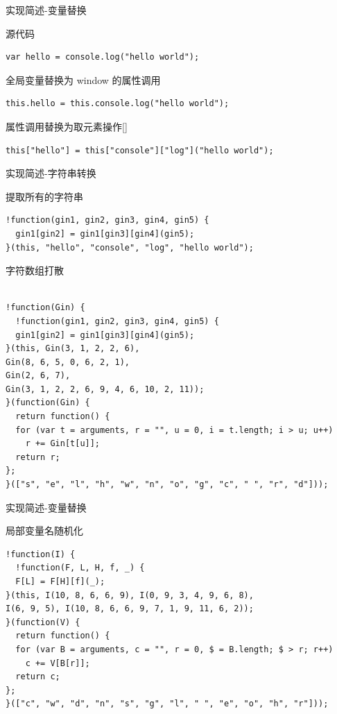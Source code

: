 \documentclass[presentation]{beamer}
\begin{document}
\begin{frame}[fragile,label=sec-11]{实现简述-变量替换}
\begin{block}{源代码}
\begin{verbatim}
var hello = console.log("hello world");
\end{verbatim}
\end{block}
\begin{block}{全局变量替换为 window 的属性调用}
\begin{verbatim}
this.hello = this.console.log("hello world");
\end{verbatim}
\end{block}
\begin{block}{属性调用替换为取元素操作[]}
\begin{verbatim}
this["hello"] = this["console"]["log"]("hello world");
\end{verbatim}
\end{block}
\end{frame}
\begin{frame}[fragile,label=sec-12]{实现简述-字符串转换}
\begin{block}{提取所有的字符串}
\begin{verbatim}
!function(gin1, gin2, gin3, gin4, gin5) {
  gin1[gin2] = gin1[gin3][gin4](gin5);
}(this, "hello", "console", "log", "hello world");
\end{verbatim}
\end{block}
\begin{block}{字符数组打散}
\begin{verbatim}

!function(Gin) {
  !function(gin1, gin2, gin3, gin4, gin5) {
  gin1[gin2] = gin1[gin3][gin4](gin5);
}(this, Gin(3, 1, 2, 2, 6), 
Gin(8, 6, 5, 0, 6, 2, 1), 
Gin(2, 6, 7), 
Gin(3, 1, 2, 2, 6, 9, 4, 6, 10, 2, 11));
}(function(Gin) {
  return function() {
  for (var t = arguments, r = "", u = 0, i = t.length; i > u; u++) 
    r += Gin[t[u]];
  return r;
};
}(["s", "e", "l", "h", "w", "n", "o", "g", "c", " ", "r", "d"]));

\end{verbatim}
\end{block}
\end{frame}
\begin{frame}[fragile,label=sec-13]{实现简述-变量替换}
\begin{block}{局部变量名随机化}
\begin{verbatim}
!function(I) {
  !function(F, L, H, f, _) {
  F[L] = F[H][f](_);
}(this, I(10, 8, 6, 6, 9), I(0, 9, 3, 4, 9, 6, 8), 
I(6, 9, 5), I(10, 8, 6, 6, 9, 7, 1, 9, 11, 6, 2));
}(function(V) {
  return function() {
  for (var B = arguments, c = "", r = 0, $ = B.length; $ > r; r++) 
    c += V[B[r]];
  return c;
};
}(["c", "w", "d", "n", "s", "g", "l", " ", "e", "o", "h", "r"]));

\end{verbatim}
\end{block}
\end{frame}
\end{document}

